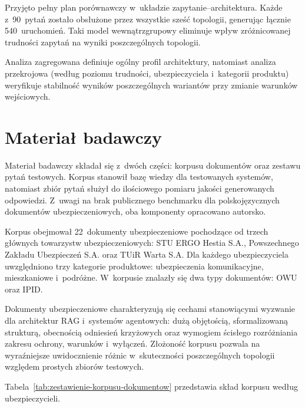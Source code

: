 Przyjęto pełny plan porównawczy w~układzie zapytanie--architektura. Każde
z~90~pytań zostało obsłużone przez wszystkie sześć topologii, generując łącznie
540~uruchomień. Taki model wewnątrzgrupowy eliminuje wpływ zróżnicowanej
trudności zapytań na wyniki poszczególnych topologii.

Analiza zagregowana definiuje ogólny profil architektury, natomiast analiza
przekrojowa (według poziomu trudności, ubezpieczyciela i~kategorii produktu)
weryfikuje stabilność wyników poszczególnych wariantów przy zmianie warunków
wejściowych.

\section{Materiał badawczy}\label{sec:material-badawczy}

Materiał badawczy składał się z~dwóch części: korpusu dokumentów oraz zestawu
pytań testowych. Korpus stanowił bazę wiedzy dla testowanych systemów,
natomiast zbiór pytań służył do ilościowego pomiaru jakości generowanych
odpowiedzi. Z~uwagi na brak publicznego benchmarku dla polskojęzycznych
dokumentów ubezpieczeniowych, oba komponenty opracowano autorsko.

Korpus obejmował 22~dokumenty ubezpieczeniowe pochodzące od trzech głównych
towarzystw ubezpieczeniowych: STU ERGO Hestia S.A., Powszechnego Zakładu
Ubezpieczeń S.A. oraz TUiR Warta S.A. Dla każdego ubezpieczyciela uwzględniono
trzy kategorie produktowe: ubezpieczenia komunikacyjne, mieszkaniowe
i~podróżne. W~korpusie znalazły się dwa typy dokumentów: OWU oraz IPID.

Dokumenty ubezpieczeniowe charakteryzują się cechami stanowiącymi wyzwanie dla
architektur RAG i~systemów agentowych: dużą objętością, sformalizowaną
strukturą, obecnością odniesień krzyżowych oraz wymogiem ścisłego rozróżniania
zakresu ochrony, warunków i~wyłączeń. Złożoność korpusu pozwala na wyraźniejsze
uwidocznienie różnic w~skuteczności poszczególnych topologii względem prostych
zbiorów testowych.

Tabela~\ref{tab:zestawienie-korpusu-dokumentow} przedstawia skład korpusu
według ubezpieczycieli.

